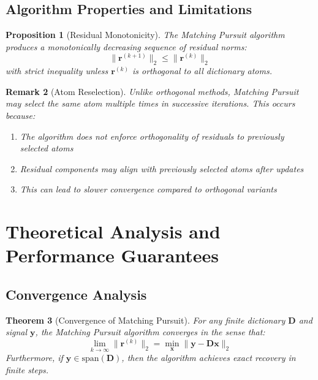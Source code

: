 \documentclass[12pt]{article}
\newtheorem{theorem}{Theorem}[section]
\newtheorem{proposition}[theorem]{Proposition}
\newtheorem{remark}[theorem]{Remark}
\begin{document}
\subsection{Algorithm Properties and Limitations}

\begin{proposition}[Residual Monotonicity]\label{prop:residual_monotonicity}
    The Matching Pursuit algorithm produces a monotonically decreasing sequence of residual norms:
    \begin{equation}
        \|\mathbf{r}^{(k+1)}\|_2 \leq \|\mathbf{r}^{(k)}\|_2
    \end{equation}
    with strict inequality unless $\mathbf{r}^{(k)}$ is orthogonal to all dictionary atoms.
\end{proposition}

\begin{remark}[Atom Reselection]
    Unlike orthogonal methods, Matching Pursuit may select the same atom multiple times in successive iterations. This occurs because:
    \begin{enumerate}
        \item The algorithm does not enforce orthogonality of residuals to previously selected atoms
        \item Residual components may align with previously selected atoms after updates
        \item This can lead to slower convergence compared to orthogonal variants
    \end{enumerate}
\end{remark}

\newpage

\section{Theoretical Analysis and Performance Guarantees}

\subsection{Convergence Analysis}

\begin{theorem}[Convergence of Matching Pursuit]\label{thm:mp_convergence}
    For any finite dictionary $\mathbf{D}$ and signal $\mathbf{y}$, the Matching Pursuit algorithm converges in the sense that:
    \begin{equation}
        \lim_{k \to \infty} \|\mathbf{r}^{(k)}\|_2 = \min_{\mathbf{x}} \|\mathbf{y} - \mathbf{D}\mathbf{x}\|_2
    \end{equation}
    Furthermore, if $\mathbf{y} \in \text{span}(\mathbf{D})$, then the algorithm achieves exact recovery in finite steps.
\end{theorem}
\end{document}
